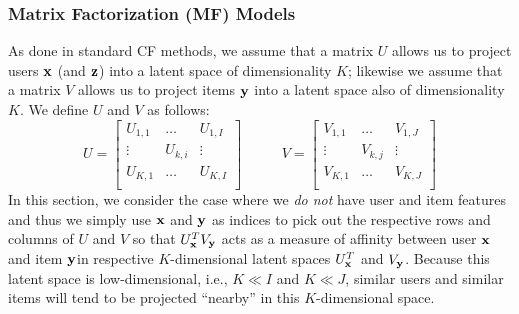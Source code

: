 
\subsubsection{Matrix Factorization (MF) Models}
\label{sec:mf}

As done in standard CF methods, we assume that
a matrix $U$ allows us to project users $\mathbf{x}$ (and $\mathbf{z}$)
into a latent space of dimensionality $K$; likewise we assume that
a matrix $V$ allows us to project items $\mathbf{y}$ into a latent
space also of dimensionality $K$.  We define $U$ and $V$
as follows:
\begin{equation*}
U = 
\begin{bmatrix}
  U_{1,1} & \hdots  & U_{1,I} \\
  \vdots  & U_{k,i} & \vdots  \\
  U_{K,1} & \hdots  & U_{K,I} \\
\end{bmatrix}
\qquad \; \; \;
V = 
\begin{bmatrix}
  V_{1,1} & \hdots  & V_{1,J} \\
  \vdots  & V_{k,j} & \vdots  \\
  V_{K,1} & \hdots  & V_{K,J} \\
\end{bmatrix}
\end{equation*}
In this section, we consider the case where 
we \emph{do not} have user and item features and thus we simply use
$\mathbf{x}$ and $\mathbf{y}$ as indices to pick out the respective rows and columns
of $U$ and $V$ so that $U_{\mathbf{x}}^T V_{\mathbf{y}}$ acts as a measure of affinity 
between user $\mathbf{x}$ and item $\mathbf{y}$in respective $K$-dimensional
latent spaces $U_{\mathbf{x}}^T$ and $V_{\mathbf{y}}$.    
Because this latent space is low-dimensional, i.e., $K \ll
I$ and $K \ll J$, similar users and similar items will tend to be
projected ``nearby'' in this $K$-dimensional space.

